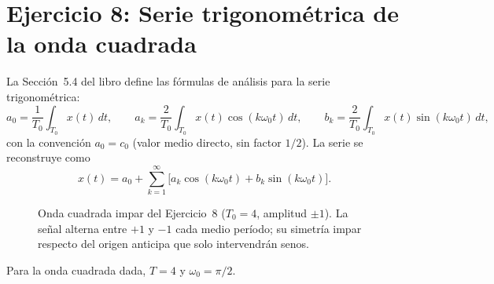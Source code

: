 \documentclass[10pt,a4paper]{article}
\begin{document}
	\section*{Ejercicio 8: Serie trigonométrica de la onda cuadrada}

	La Sección~5.4 del libro define las fórmulas de análisis para la serie trigonométrica:
	\[
		a_0 = \frac{1}{T_0}\int_{T_0} x(t)\,dt, \qquad
		a_k = \frac{2}{T_0}\int_{T_0} x(t)\cos(k\omega_0 t)\,dt, \qquad
		b_k = \frac{2}{T_0}\int_{T_0} x(t)\sin(k\omega_0 t)\,dt,
	\]
	con la convención $a_0 = c_0$ (valor medio directo, sin factor $1/2$). La serie se reconstruye como
	\[
		x(t) = a_0 + \sum_{k=1}^{\infty}\bigl[a_k\cos(k\omega_0 t) + b_k\sin(k\omega_0 t)\bigr].
	\]

	\begin{figure}[H]
		\centering
		
		\caption{Onda cuadrada impar del Ejercicio~8 ($T_0 = 4$, amplitud $\pm 1$). La señal alterna entre $+1$ y $-1$ cada medio período; su simetría impar respecto del origen anticipa que solo intervendrán senos.}
		\label{fig:ej8_senal}
	\end{figure}

	Para la onda cuadrada dada, $T = 4$ y $\omega_0 = \pi/2$.
\end{document}

